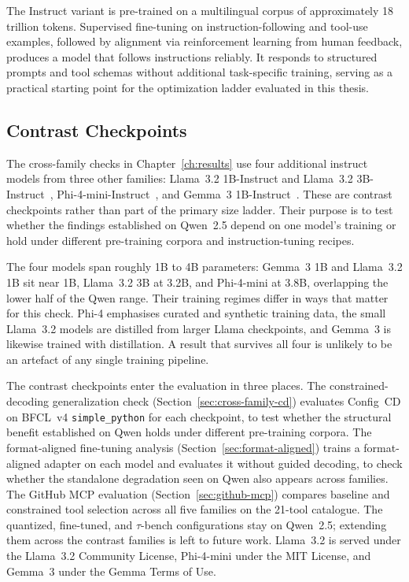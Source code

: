 The Instruct variant is pre-trained on a multilingual corpus of approximately
18 trillion tokens. Supervised fine-tuning on instruction-following and tool-use
examples, followed by alignment via reinforcement learning from human feedback,
produces a model that follows instructions reliably. It responds to structured
prompts and tool schemas without additional task-specific training, serving as
a practical starting point for the optimization ladder evaluated in this thesis.

\subsection{Contrast Checkpoints}
\label{sec:contrast-checkpoints}

The cross-family checks in Chapter~\ref{ch:results} use four additional instruct
models from three other families: Llama~3.2 1B-Instruct and Llama~3.2
3B-Instruct~\cite{metaai2024llama32}, Phi-4-mini-Instruct~\cite{abdin2024phi},
and Gemma~3 1B-Instruct~\cite{gemmateam2025gemma3}. These are contrast
checkpoints rather than part of the primary size ladder. Their purpose is to
test whether the findings established on Qwen~2.5 depend on one model's training
or hold under different pre-training corpora and instruction-tuning recipes.

The four models span roughly 1B to 4B parameters: Gemma~3 1B and Llama~3.2 1B
sit near 1B, Llama~3.2 3B at 3.2B, and Phi-4-mini at 3.8B, overlapping the lower
half of the Qwen range. Their training regimes differ in ways that matter for
this check. Phi-4 emphasises curated and synthetic training data, the small
Llama~3.2 models are distilled from larger Llama checkpoints, and Gemma~3 is
likewise trained with distillation. A result that survives all four is unlikely
to be an artefact of any single training pipeline.

The contrast checkpoints enter the evaluation in three places. The
constrained-decoding generalization check (Section~\ref{sec:cross-family-cd})
evaluates Config~CD on BFCL~v4 \texttt{simple\_python} for each checkpoint, to
test whether the structural benefit established on Qwen holds under different
pre-training corpora. The format-aligned fine-tuning analysis
(Section~\ref{sec:format-aligned}) trains a format-aligned adapter on each model
and evaluates it without guided decoding, to check whether the standalone
degradation seen on Qwen also appears across families. The GitHub MCP evaluation
(Section~\ref{sec:github-mcp}) compares baseline and constrained tool selection
across all five families on the 21-tool catalogue. The quantized, fine-tuned,
and $\tau$-bench configurations stay on Qwen~2.5; extending them across the
contrast families is left to future work. Llama~3.2 is served under
the Llama~3.2 Community License, Phi-4-mini under the MIT License, and Gemma~3
under the Gemma Terms of Use.

